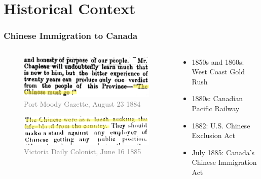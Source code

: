 \documentclass[xcolor=dvipsnames, compress, 12pt, aspectratio=169, handout]{beamer}
\begin{document}
\section{Historical Context}
\begin{frame}
    \frametitle{Chinese Immigration to Canada}
    \begin{columns}
        \begin{column}{0.5\textwidth}
            \begin{figure}
                \includegraphics[width=\textwidth]{../../figs/slides/portmoody_1884.png}
                \caption{\textcolor{gray}{Port Moody Gazette, August 23 1884}}
            \end{figure}
            \begin{figure}
                \includegraphics[width=\textwidth]{../../figs/slides/victoria_1885.png}
                \caption{\textcolor{gray}{Victoria Daily Colonist, June 16 1885}}
            \end{figure}
        \end{column}
        \begin{column}{0.5\textwidth}  
            \begin{itemize}
                \item 1850s and 1860s: West Coast Gold Rush
                \vspace{2mm}
                \item 1880s: Canadian Pacific Railway
                \vspace{2mm}
                \item 1882: U.S. Chinese Exclusion Act
                \vspace{2mm}
                \item July 1885: Canada's Chinese Immigration Act
            \end{itemize}
        \end{column}
    \end{columns}
\end{frame}
\end{document}
